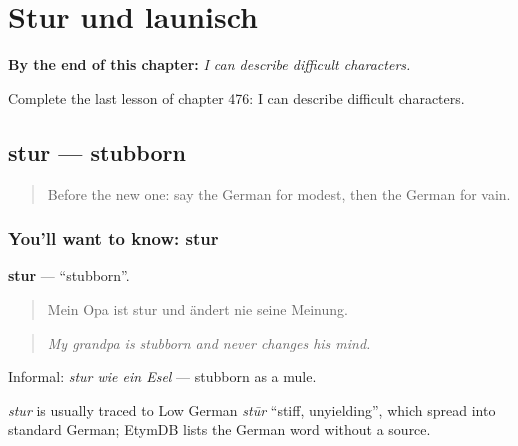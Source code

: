 
\chapter{Stur und launisch}
\label{ch:ge-stur-und-launisch}

\begin{chapteropening}
\textbf{By the end of this chapter:} \emph{I can describe difficult characters.}

Complete the last lesson of chapter 476: I can describe difficult characters.
\end{chapteropening}

\section[stur]{stur — stubborn}

\label{lesson:GE-C476-stur}



\begin{quote}
Before the new one: say the German for modest, then the German for vain.
\end{quote}

\subsection*{You'll want to know: stur}
\textbf{stur} — \textquotedblleft{}stubborn\textquotedblright{}.

\begin{quote}
Mein Opa ist stur und ändert nie seine Meinung.
\end{quote}

\begin{quote}
\emph{My grandpa is stubborn and never changes his mind.}
\end{quote}

Informal: \emph{stur wie ein Esel} — stubborn as a mule.

\begin{cousinweb}
\emph{stur} is usually traced to Low German \emph{stūr} \textquotedblleft{}stiff, unyielding\textquotedblright{}, which spread into standard German; EtymDB lists the German word without a source.
\end{cousinweb}

